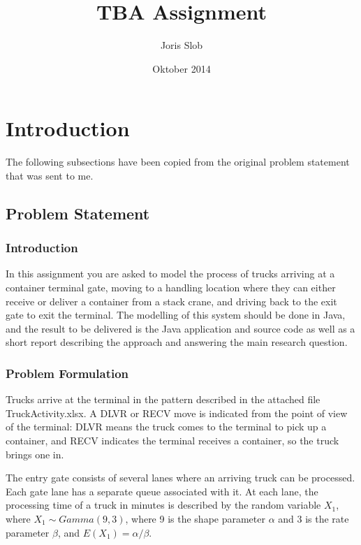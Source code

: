 \documentclass{article}
\begin{document}
\title{TBA Assignment}
\author{Joris Slob}
\date{Oktober 2014}
\maketitle

\section{Introduction}

The following subsections have been copied from the original problem
statement that was sent to me.

\subsection{Problem Statement}

\subsubsection{Introduction}

In this assignment you are asked to model the process of trucks
arriving at a container terminal gate, moving to a handling location
where they can either receive or deliver a container from a stack
crane, and driving back to the exit gate to exit the terminal. The
modelling of this system should be done in Java, and the result to be
delivered is the Java application and source code as well as a short
report describing the approach and answering the main research
question.

\subsubsection{Problem Formulation}

Trucks arrive at the terminal in the pattern described in the attached
file TruckActivity.xlsx. A DLVR or RECV move is indicated from the
point of view of the terminal: DLVR means the truck comes to the
terminal to pick up a container, and RECV indicates the terminal
receives a container, so the truck brings one in.

The entry gate consists of several lanes where an arriving truck can
be processed. Each gate lane has a separate queue associated with
it. At each lane, the processing time of a truck in minutes is
described by the random variable $X_1$, where $X_1 \sim Gamma(9, 3)$,
where 9 is the shape parameter $\alpha$ and 3 is the rate parameter
$\beta$, and $E(X_1) = \alpha / \beta$.
\end{document}
